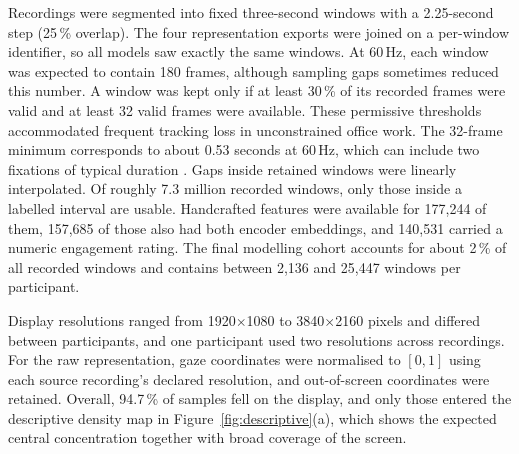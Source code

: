 Recordings were segmented into fixed three-second windows with a 2.25-second step (25\,\% overlap).
The four representation exports were joined on a per-window identifier, so all models saw exactly the same windows.
At 60\,Hz, each window was expected to contain 180 frames, although sampling gaps sometimes reduced this number.
A window was kept only if at least 30\,\% of its recorded frames were valid and at least 32 valid frames were available.
These permissive thresholds accommodated frequent tracking loss in unconstrained office work.
The 32-frame minimum corresponds to about 0.53 seconds at 60\,Hz, which can include two fixations of typical duration \cite{rayner1998reading}.
Gaps inside retained windows were linearly interpolated.
Of roughly 7.3 million recorded windows, only those inside a labelled interval are usable.
Handcrafted features were available for 177{,}244 of them, 157{,}685 of those also had both encoder embeddings, and 140{,}531 carried a numeric engagement rating.
The final modelling cohort accounts for about 2\,\% of all recorded windows and contains between 2{,}136 and 25{,}447 windows per participant.

Display resolutions ranged from 1920$\times$1080 to 3840$\times$2160 pixels and differed between participants, and one participant used two resolutions across recordings.
For the raw representation, gaze coordinates were normalised to $[0,1]$ using each source recording's declared resolution, and out-of-screen coordinates were retained.
Overall, 94.7\,\% of samples fell on the display, and only those entered the descriptive density map in Figure~\ref{fig:descriptive}(a), which shows the expected central concentration together with broad coverage of the screen.

